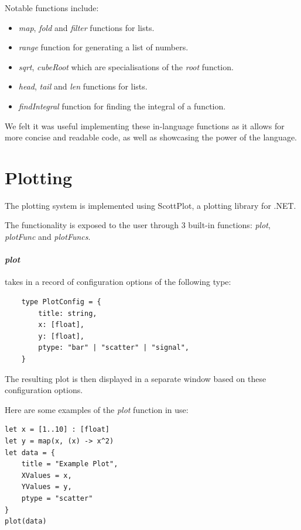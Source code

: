 Notable functions include:

\begin{itemize}
    \item \textit{map}, \textit{fold} and \textit{filter} functions for lists.
    \item \textit{range} function for generating a list of numbers.
    \item \textit{sqrt}, \textit{cubeRoot} which are specialisations of the \textit{root} function.
    \item \textit{head}, \textit{tail} and \textit{len} functions for lists.
    \item \textit{findIntegral} function for finding the integral of a function.
\end{itemize}

We felt it was useful implementing these in-language functions as it allows for more concise and readable code, as
well as showcasing the power of the language.

\section{Plotting}\label{sec:plotting}

The plotting system is implemented using ScottPlot\citep{scottPlot}, a plotting library for .NET\@.

The functionality is exposed to the user through 3 built-in functions: \textit{plot}, \textit{plotFunc} and 
\textit{plotFuncs}.

\paragraph{\textit{plot}} takes in a record of configuration options of the following type:

\begin{verbatim}
    type PlotConfig = {
        title: string,
        x: [float],
        y: [float],
        ptype: "bar" | "scatter" | "signal",
    }
\end{verbatim}

The resulting plot is then displayed in a separate window based on these configuration options.

Here are some examples of the \textit{plot} function in use:

\begin{verbatim}
let x = [1..10] : [float]
let y = map(x, (x) -> x^2)
let data = {
    title = "Example Plot",
    XValues = x,
    YValues = y,
    ptype = "scatter"
}
plot(data)
\end{verbatim}

